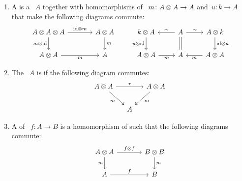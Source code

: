 \documentclass[a4paper,10pt,headings=standardclasses]{scrartcl}
\begin{document}
\begin{definition}
  \leavevmode
  \begin{enumerate}
    \item
      A  is a {\dgv}~$A$ together with homomorphisms of {\dgvs}~$m \colon A \otimes A \to A$ and~$u \colon k \to A$ that make the following diagrams commute:
      \[
        \begin{tikzcd}[column sep = large]
          A \tensor A \tensor A
          \arrow{r}[above]{{\id} \tensor m}
          \arrow{d}[left]{m \tensor {\id}}
          &
          A \tensor A
          \arrow{d}[right]{m}
          \\
          A \tensor A
          \arrow{r}[below]{m}
          &
          A
        \end{tikzcd}
        \qquad
        \begin{tikzcd}
          k \tensor A
          \arrow{d}[left]{u \tensor {\id}}
          &
          A
          \arrow{l}[above]{\sim}
          \arrow[equal]{d}
          \arrow{r}[above]{\sim}
          &
          A \tensor k
          \arrow{d}[right]{{\id} \tensor u}
          \\
          A \tensor A
          \arrow{r}[below]{m}
          &
          A
          &
          A \tensor A
          \arrow{l}[below]{m}
        \end{tikzcd}
      \]
    \item
      The {\dga}~$A$ is  if the following diagram commutes:
      \[
        \begin{tikzcd}[column sep = small]
          A \tensor A
          \arrow{rr}[above]{\tau}
          \arrow{dr}[below left]{m}
          &
          {}
          &
          A \tensor A
          \arrow{dl}[below right]{m}
          \\
          {}
          &
          A
          &
          {}
        \end{tikzcd}
      \]
    \item
      A  of {\dgas}~$f \colon A \to B$ is a homomorphism of {\dgvs} such that the following diagrams commute:
      \[
        \begin{tikzcd}[column sep = large]
          A \tensor A
          \arrow{r}[above]{f \tensor f}
          \arrow{d}[left]{m}
          &
          B \tensor B
          \arrow{d}[right]{m}
          \\
          A
          \arrow{r}[above]{f}
          &
          B
        \end{tikzcd}
\]
\end{enumerate}
\end{definition}
\end{document}
